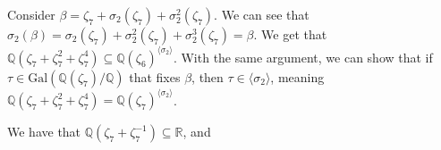 \documentclass[10pt]{extarticle}
\newcommand{\Q}{\mathbb{Q}}
\newcommand{\R}{\mathbb{R}}
\begin{document}
  Consider $\beta = \zeta_7 + \sigma_2(\zeta_7) + \sigma_2^2(\zeta_7)$. We can see that $\sigma_2(\beta) = \sigma_2(\zeta_7) + \sigma_2^2(\zeta_7) + \sigma_2^3(\zeta_7) = \beta$. We get that $\Q(\zeta_7 + \zeta_7^2 + \zeta_7^4)\subseteq \Q(\zeta_6)^{\langle \sigma_2\rangle}$. With the same argument, we can show that if $\tau\in\text{Gal}(\Q(\zeta_7)/\Q)$ that fixes $\beta$, then $\tau\in \langle \sigma_2\rangle$, meaning $\Q(\zeta_7+\zeta_7^2 + \zeta_7^4) = \Q(\zeta_7)^{\langle \sigma_2\rangle}$.
  \begin{center}
    \scriptsize
  \end{center}
  We have that $\Q(\zeta_7 + \zeta_7^{-1})\subseteq \R$, and
\end{document}
